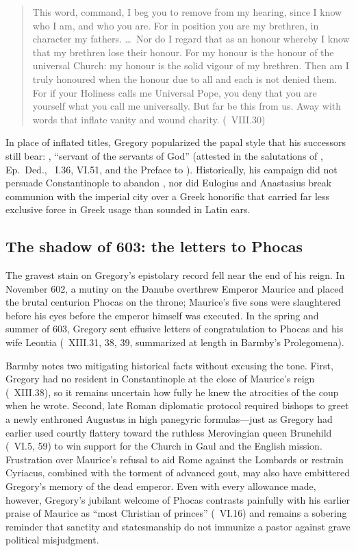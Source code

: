 \begin{quote}
This word, command, I beg you to remove from my hearing, since I know who I am,
and who you are. For in position you are my brethren, in character my fathers.
\dots\ Nor do I regard that as an honour whereby I know that my brethren lose
their honour. For my honour is the honour of the universal Church: my honour is
the solid vigour of my brethren. Then am I truly honoured when the honour due
to all and each is not denied them. For if your Holiness calls me Universal
Pope, you deny that you are yourself what you call me universally. But far be
this from us. Away with words that inflate vanity and wound charity.
(\ VIII.30)
\end{quote}

In place of inflated titles, Gregory popularized the papal style that his
successors still bear: , ``servant of the servants
of God'' (attested in the salutations of , Ep.\ Ded., \
I.36, VI.51, and the Preface to ). Historically,
his campaign did not persuade Constantinople to abandon \latin{Oikoumenikos},
nor did Eulogius and Anastasius break communion with the imperial city over a
Greek honorific that carried far less exclusive force in Greek usage than
\latin{universalis} sounded in Latin ears.

\subsection{The shadow of 603: the letters to Phocas}

The gravest stain on Gregory's epistolary record fell near the end of his
reign. In November 602, a mutiny on the Danube overthrew Emperor Maurice and
placed the brutal centurion Phocas on the throne; Maurice's five sons were
slaughtered before his eyes before the emperor himself was executed. In the
spring and summer of 603, Gregory sent effusive letters of congratulation to
Phocas and his wife Leontia (\work{Ep.}\ XIII.31, 38, 39, summarized at length
in Barmby's Prolegomena).

Barmby notes two mitigating historical facts without excusing the tone. First,
Gregory had no resident \latin{apocrisiarius} in Constantinople at the close of
Maurice's reign (\work{Ep.}\ XIII.38), so it remains uncertain how fully he
knew the atrocities of the coup when he wrote. Second, late Roman diplomatic
protocol required bishops to greet a newly enthroned Augustus in high panegyric
formulas---just as Gregory had earlier used courtly flattery toward the
ruthless Merovingian queen Brunehild (\work{Ep.}\ VI.5, 59) to win support for
the Church in Gaul and the English mission. Frustration over Maurice's refusal
to aid Rome against the Lombards or restrain Cyriacus, combined with the
torment of advanced gout, may also have embittered Gregory's memory of the dead
emperor. Even with every allowance made, however, Gregory's jubilant welcome of
Phocas contrasts painfully with his earlier praise of Maurice as ``most
Christian of princes'' (\work{Ep.}\ VI.16) and remains a sobering reminder that
sanctity and statesmanship do not immunize a pastor against grave political
misjudgment.
